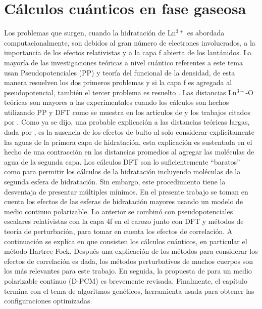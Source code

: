 \section{C\'alculos cu\'anticos en fase gaseosa}
Los problemas que surgen, cuando la hidrataci\'on de Ln$^{3+}$ es 
abordada computacionalmente, son debidos al gran n\'umero de 
electrones involucrados, a la importancia de los efectos relativistas
y a la capa f abierta de los lant\'anidos. La mayor\'ia de las 
investigaciones te\'oricas a nivel cu\'antico referentes a este tema 
usan Pseudopotenciales (PP) y teor\'ia del funcional de la densidad,
de esta manera resuelven los dos primeros problemas y si la capa f es
agregada al pseudopotencial, tambi\'en el tercer problema es resuelto
\citep{Ciup2010}. Las distancias Ln$^{3+}$-O te\'oricas son mayores a
las experimentales cuando los c\'alculos son hechos utilizando PP y 
DFT como se muestra en los art\'iculos de \cite{Kuta2010} y los 
trabajos citados por \cite{Dang2012}. Como ya se dijo, una probable
explicaci\'on a las distancias te\'oricas largas, dada por 
\cite{Kuta2010}, es la ausencia de los efectos de bulto al solo 
considerar expl\'icitamente las aguas de la primera capa de 
hidrataci\'on, esta explicaci\'on es sustentada en el hecho de una 
contracci\'on en las distancias promedios al agregar las mol\'eculas 
de agua de la segunda capa. Los c\'alculos DFT son lo suficientemente
``baratos'' como para permitir los c\'alculos de la hidrataci\'on 
incluyendo mol\'eculas de la segunda esfera de hidrataci\'on. Sin 
embargo, este procedimiento tiene la desventaja de presentar 
m\'ultiples m\'inimos. En el presente trabajo se toman en cuenta 
los efectos de las esferas de hidrataci\'on mayores usando un modelo 
de medio continuo polarizable. Lo anterior se combin\'o
con pseudopotenciales escalares relativistas con la capa 4f en el 
carozo junto con DFT y m\'etodos de teor\'ia de perturbaci\'on, para
tomar en cuenta los efectos de correlaci\'on. A continuaci\'on se 
explica en que consisten los c\'alculos cu\'anticos, en particular el
m\'etodo Hartree-Fock. Despu\'es una explicaci\'on de los m\'etodos
para considerar los efectos de correlaci\'on es dada, los m\'etodos
perturbativos de muchos cuerpos son los m\'as relevantes para este 
trabajo. En seguida, la propuesta de \cite{Toma2005} para un medio
polarizable continuo (D-PCM) es brevemente revisada. Finalmente, el
cap\'itulo termina con el tema de algoritmos gen\'eticos, herramienta
usada para obtener las configuraciones optimizadas.

